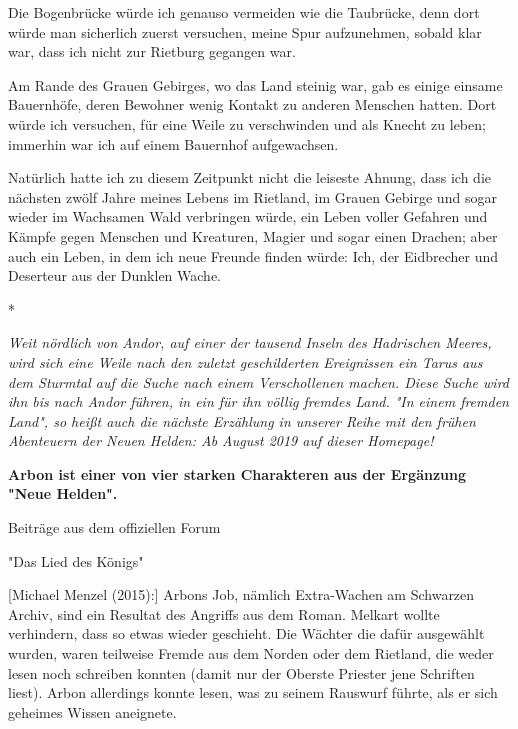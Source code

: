 \documentclass[10pt, a4paper, oneside]{book}
\begin{document}
\begin{multicols}{2}
Die Bogenbrücke würde ich genauso vermeiden wie die Taubrücke, denn dort würde man sicherlich zuerst versuchen, meine Spur aufzunehmen, sobald klar war, dass ich nicht zur Rietburg gegangen war.

Am Rande des Grauen Gebirges, wo das Land steinig war, gab es einige einsame Bauernhöfe, deren Bewohner wenig Kontakt zu anderen Menschen hatten. Dort würde ich versuchen, für eine Weile zu verschwinden und als Knecht zu leben; immerhin war ich auf einem Bauernhof aufgewachsen.

Natürlich hatte ich zu diesem Zeitpunkt nicht die leiseste Ahnung, dass ich die nächsten zwölf Jahre meines Lebens im Rietland, im Grauen Gebirge und sogar wieder im Wachsamen Wald verbringen würde, ein Leben voller Gefahren und Kämpfe gegen Menschen und Kreaturen, Magier und sogar einen Drachen; aber auch ein Leben, in dem ich neue Freunde finden würde: Ich, der Eidbrecher und Deserteur aus der Dunklen Wache.

\begin{center}
    *
\end{center}

\textit{Weit nördlich von Andor, auf einer der tausend Inseln des Hadrischen Meeres, wird sich eine Weile nach den zuletzt geschilderten Ereignissen ein Tarus aus dem Sturmtal auf die Suche nach einem Verschollenen machen. Diese Suche wird ihn bis nach Andor führen, in ein für ihn völlig fremdes Land. "In einem fremden Land", so heißt auch die nächste Erzählung in unserer Reihe mit den frühen Abenteuern der Neuen Helden: Ab August 2019 auf dieser Homepage!}\bigskip

\textbf{Arbon ist einer von vier starken Charakteren aus der Ergänzung "Neue Helden".}





\begin{center} 
    Beiträge aus dem offiziellen Forum

    "Das Lied des Königs"
\end{center}

[Michael Menzel (2015):] Arbons Job, nämlich Extra-Wachen am Schwarzen Archiv, sind ein Resultat des Angriffs aus dem Roman. Melkart wollte verhindern, dass so etwas wieder geschieht. Die Wächter die dafür ausgewählt wurden, waren teilweise Fremde aus dem Norden oder dem Rietland, die weder lesen noch schreiben konnten (damit nur der Oberste Priester jene Schriften liest). Arbon allerdings konnte lesen, was zu seinem Rauswurf führte, als er sich geheimes Wissen aneignete.


\end{multicols}
\end{document}
